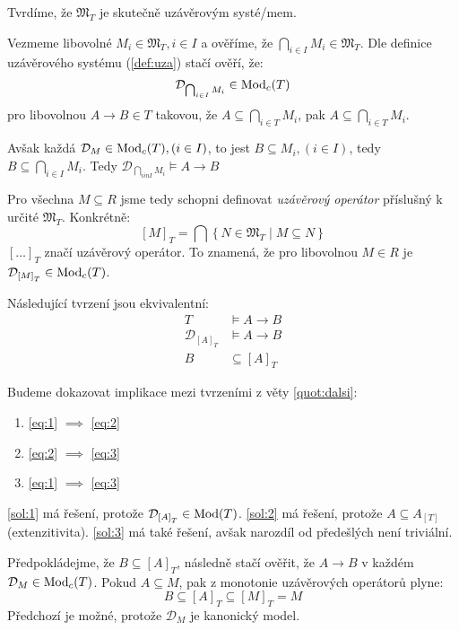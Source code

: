 \begin{upquote}
Tvrdíme, že $\mathfrak{M}_{T}$ je skutečně uzávěrovým systé\-/mem. 
\end{upquote}

\begin{upproof}
Vezmeme libovolné $M_{i} \in \mathfrak{M}_{T}, i \in I$ a ověříme, že $\bigcap_{i \in I}M_{i} \in \mathfrak{M}_{T}$.
Dle definice uzávěrového systému (\ref{def:uza}) stačí ověří, že:
$$
\mathcal{D}_{\bigcap_{i \in I} M_{i}} \in \operatorname{Mod}_{c}(T)
$$
pro libovolnou $A \to B \in T$ takovou, že $A \subseteq \bigcap_{i \in T} M_{i}$, pak $A \subseteq \bigcap_{i \in T} M_{i}$.

Avšak každá $\mathcal{D}_{M} \in \operatorname{Mod}_{c}(T), (i \in I)$, to jest $B \subseteq M_{i}, (i \in I)$, tedy $B \subseteq \bigcap_{i \in I} M_{i}$. Tedy $\mathcal{D}_{\bigcap_{i in I} M_{i}} \vDash A \to B$
\end{upproof}

\begin{uptheorem}
Pro všechna $M \subseteq R$ jsme tedy schopni definovat \textit{uzávěrový operátor} příslušný k určité $\mathfrak{M}_{T}$. Konkrétně:
$$
\left[ M \right]_{T} = \bigcap \left\{ N \in \mathfrak{M}_{T} \; | \; M \subseteq N \right\}
$$
$\left[ \ldots \right]_{T}$ značí uzávěrový operátor. To znamená, že pro libovolnou $M \in R$ je $\mathcal{D}_{\left[ M \right]_{T}} \in \operatorname{Mod}_{c}(T)$.
\end{uptheorem}

\begin{upquote}\label{quot:dalsi}
Následující tvrzení jsou ekvivalentní:
\begin{align}
T &\vDash A \to B \label{eq:1} \\
\mathcal{D}_{\left[ A \right]_{T}} &\vDash A \to B \label{eq:2} \\
B &\subseteq \left[ A \right]_{T}\label{eq:3}
\end{align}
\end{upquote}

\begin{upproof}
Budeme dokazovat implikace mezi tvrzeními z věty \ref{quot:dalsi}:
\begin{enumerate}
\item\label{sol:1} \ref{eq:1} $\implies$ \ref{eq:2}
\item\label{sol:2} \ref{eq:2} $\implies$ \ref{eq:3}
\item\label{sol:3} \ref{eq:1} $\implies$ \ref{eq:3}
\end{enumerate}
\ref{sol:1} má řešení, protože $\mathcal{D}_{\left[ A \right]_{T}} \in \operatorname{Mod}(T)$. \ref{sol:2} má řešení, protože $A \subseteq A_{\left[ T \right]}$ (extenzitivita). \ref{sol:3} má také řešení, avšak narozdíl od předešlých není triviální.

Předpokládejme, že $B \subseteq \left[ A \right]_{T}$, následně stačí ověřit, že $A \to B$ v každém $\mathcal{D}_{M} \in \operatorname{Mod}_{c}(T)$. Pokud $A \subseteq M$, pak z monotonie uzávěrových operátorů plyne:
$$
B \subseteq \left[ A \right]_{T} \subseteq \left[ M \right]_{T} = M
$$
Předchozí je možné, protože $\mathcal{D}_{M}$ je kanonický model.
\end{upproof}


